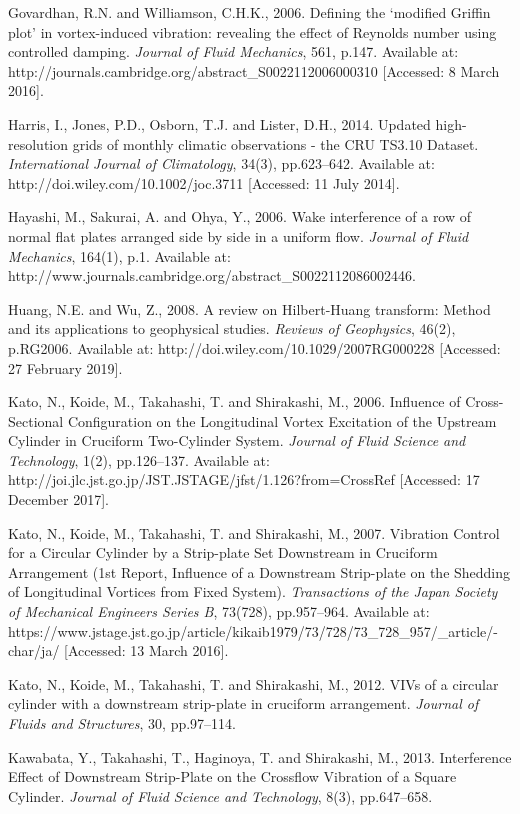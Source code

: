 \documentclass[]{article}
\begin{document}
Govardhan, R.N. and Williamson, C.H.K., 2006. Defining the `modified
Griffin plot' in vortex-induced vibration: revealing the effect of
Reynolds number using controlled damping. \emph{Journal of Fluid
Mechanics}, 561, p.147. Available at:
http://journals.cambridge.org/abstract\_S0022112006000310 {[}Accessed: 8
March 2016{]}.

Harris, I., Jones, P.D., Osborn, T.J. and Lister, D.H., 2014. Updated
high-resolution grids of monthly climatic observations - the CRU TS3.10
Dataset. \emph{International Journal of Climatology}, 34(3),
pp.623--642. Available at: http://doi.wiley.com/10.1002/joc.3711
{[}Accessed: 11 July 2014{]}.

Hayashi, M., Sakurai, A. and Ohya, Y., 2006. Wake interference of a row
of normal flat plates arranged side by side in a uniform flow.
\emph{Journal of Fluid Mechanics}, 164(1), p.1. Available at:
http://www.journals.cambridge.org/abstract\_S0022112086002446.

Huang, N.E. and Wu, Z., 2008. A review on Hilbert-Huang transform:
Method and its applications to geophysical studies. \emph{Reviews of
Geophysics}, 46(2), p.RG2006. Available at:
http://doi.wiley.com/10.1029/2007RG000228 {[}Accessed: 27 February
2019{]}.

Kato, N., Koide, M., Takahashi, T. and Shirakashi, M., 2006. Influence
of Cross-Sectional Configuration on the Longitudinal Vortex Excitation
of the Upstream Cylinder in Cruciform Two-Cylinder System. \emph{Journal
of Fluid Science and Technology}, 1(2), pp.126--137. Available at:
http://joi.jlc.jst.go.jp/JST.JSTAGE/jfst/1.126?from=CrossRef
{[}Accessed: 17 December 2017{]}.

Kato, N., Koide, M., Takahashi, T. and Shirakashi, M., 2007. Vibration
Control for a Circular Cylinder by a Strip-plate Set Downstream in
Cruciform Arrangement (1st Report, Influence of a Downstream Strip-plate
on the Shedding of Longitudinal Vortices from Fixed System).
\emph{Transactions of the Japan Society of Mechanical Engineers Series
B}, 73(728), pp.957--964. Available at:
https://www.jstage.jst.go.jp/article/kikaib1979/73/728/73\_728\_957/\_article/-char/ja/
{[}Accessed: 13 March 2016{]}.

Kato, N., Koide, M., Takahashi, T. and Shirakashi, M., 2012. VIVs of a
circular cylinder with a downstream strip-plate in cruciform
arrangement. \emph{Journal of Fluids and Structures}, 30, pp.97--114.

Kawabata, Y., Takahashi, T., Haginoya, T. and Shirakashi, M., 2013.
Interference Effect of Downstream Strip-Plate on the Crossflow Vibration
of a Square Cylinder. \emph{Journal of Fluid Science and Technology},
8(3), pp.647--658.
\end{document}
